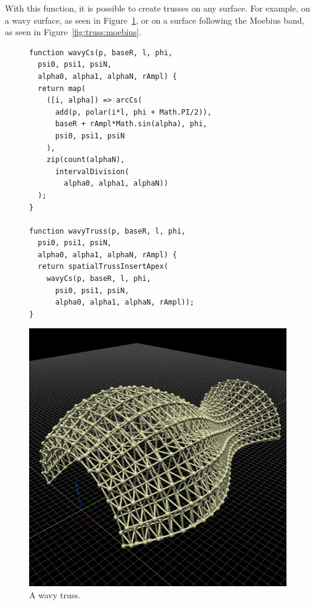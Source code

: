 With this function, it is possible to create trusses on any surface.
For example, on a wavy surface, as seen in Figure~\ref{fig:truss:wavy}, or on a surface following the Moebius band, as seen in Figure~\ref{fig:truss:moebius}.

\begin{figure}
\begin{minipage}{0.5\textwidth}
\begin{verbatim}
function wavyCs(p, baseR, l, phi,
  psi0, psi1, psiN,
  alpha0, alpha1, alphaN, rAmpl) {
  return map(
    ([i, alpha]) => arcCs(
      add(p, polar(i*l, phi + Math.PI/2)),
      baseR + rAmpl*Math.sin(alpha), phi,
      psi0, psi1, psiN
    ),
    zip(count(alphaN),
      intervalDivision(
        alpha0, alpha1, alphaN))
  );
}

function wavyTruss(p, baseR, l, phi,
  psi0, psi1, psiN,
  alpha0, alpha1, alphaN, rAmpl) {
  return spatialTrussInsertApex(
    wavyCs(p, baseR, l, phi,
      psi0, psi1, psiN,
      alpha0, alpha1, alphaN, rAmpl));
}
\end{verbatim}
\end{minipage}%
\begin{minipage}{0.5\textwidth}
  \includegraphics[width=1.0\textwidth]{./images/detail_examples/wavy_truss_crop}
\end{minipage}
\caption{A wavy truss.}
\label{fig:truss:wavy}
\end{figure}

